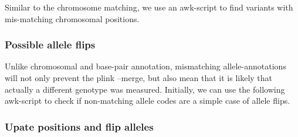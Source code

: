 \documentclass[]{article}
\newenvironment{Shaded}{}{}
\newcommand{\StringTok}[1]{\textcolor[rgb]{0.25,0.44,0.63}{#1}}
\newcommand{\FunctionTok}[1]{\textcolor[rgb]{0.02,0.16,0.49}{#1}}
\newcommand{\VariableTok}[1]{\textcolor[rgb]{0.10,0.09,0.49}{#1}}
\newcommand{\OperatorTok}[1]{\textcolor[rgb]{0.40,0.40,0.40}{#1}}
\newcommand{\NormalTok}[1]{#1}
\begin{document}
Similar to the chromosome matching, we use an awk-script to find
variants with mis-matching chromosomal positions.

\begin{Shaded}
\end{Shaded}

\subsubsection{Possible allele flips}\label{possible-allele-flips}

Unlike chromosomal and base-pair annotation, mismatching
allele-annotations will not only prevent the plink --merge, but also
mean that it is likely that actually a different genotype was measured.
Initially, we can use the following awk-script to check if non-matching
allele codes are a simple case of allele flips.

\begin{Shaded}
\end{Shaded}

\subsubsection{Upate positions and flip
alleles}\label{upate-positions-and-flip-alleles}
\end{document}
